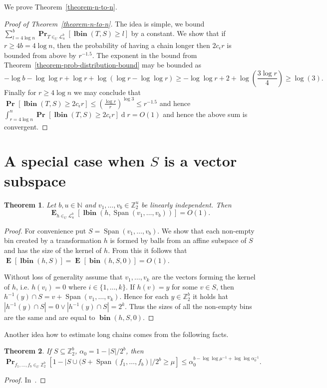 \documentclass{article}
\newcommand{\bin}[3]{\operatorname{\mathbf{bin}}({#1}, {#2}, {#3})}
\newcommand{\lbin}[2]{\operatorname{\mathbf{lbin}}({#1}, {#2})}
\newcommand{\vecspace}[2]{\mathbb{Z}_{#1}^{#2}}
\newcommand{\binvecspace}[1]{\vecspace{2}{#1}}
\newcommand{\linearmaps}[2]{\mathcal{L}_{#1}^{#2}}
\newcommand{\probs}[2]{\operatorname{\mathbf{Pr}}_{{#1}}\left[{#2}\right]}
\newcommand{\prob}[1]{\probs{}{#1}}
\newcommand{\expects}[2]{\operatorname{\mathbf{E}}_{{#1}}\left[{#2}\right]}
\newcommand{\expect}[1]{\expects{}{#1}}
\newtheorem{theorem}{Theorem}
\begin{document}
We prove Theorem~\ref{theorem-n-to-n}.
\begin{proof}[Proof of Theorem~\ref{theorem-n-to-n}]
The idea is simple, we bound $\sum_{l = 4\log n}^{b} \probs{T\in_U\linearmaps{u}{b}}{\lbin{T}{S} \geq l}$ by a constant.
We show that if $r \geq 4b = 4\log n$, then the probability of having a chain longer then $2 c_\epsilon r$ is bounded from above by $r^{-1.5}$.
The exponent in the bound from Theorem~\ref{theorem-prob-distribution-bound} may be bounded as
\[
-\log b - \log \log r + \log r + \log (\log r - \log \log r) \geq -\log \log r + 2 + \log \left(\frac{3\log r}{4}\right) \geq \log(3).
\]
Finally for $r \geq 4\log n$ we may conclude that $\prob{\lbin{T}{S} \geq 2c_\epsilon r} \leq \left(\frac{\log r}{r}\right)^{\log 3} \leq r^{-1.5}$ and hence $\int_{r = 4\log n}^{n} \prob{\lbin{T}{S} \geq 2c_\epsilon r} \operatorname{d}r = O(1)$ and hence the above sum is convergent.
\end{proof}

\section{A special case when $S$ is a vector subspace}

\begin{theorem}
Let $b, u \in \mathbb{N}$ and $v_1, \dots, v_b \in \mathbb{Z}_2^u$ be linearly independent. Then \[ \expects{h \in_U \linearmaps{u}{b}}{\lbin{h}{\operatorname{Span}(v_1, \dots, v_b)}} = O(1) .\]
\end{theorem}
\begin{proof}
For convenience put $S = \operatorname{Span}(v_1, \dots, v_b)$. 
We show that each non-empty bin created by a transformation $h$ is formed by balls from an affine subspace of $S$ and has the size of the kernel of $h$.
From this it follows that $\expect{\lbin{h}{S}} = \expect{\bin{h}{S}{0}} = O(1)$.

Without loss of generality assume that $v_1, \dots, v_k$ are the vectors forming the kernel of $h$, i.e. $h(v_i) = 0$ where $i \in \{1, \dots, k\}$.
If $h(v) = y$ for some $v \in S$, then $h^{-1}(y) \cap S = v + \operatorname{Span}(v_1, \dots, v_k)$.
Hence for each $y \in \mathbb{Z}_2^b$ it holds hat $|h^{-1}(y) \cap S| = 0 \vee |h^{-1}(y) \cap S| = 2^k$.
Thus the sizes of all the non-empty bins are the same and are equal to $\bin{h}{S}{0}$.
\end{proof}

Another idea how to estimate long chains comes from the following facts.
\begin{theorem}
\label{theorem-bound-general}
If $S \subseteq \binvecspace{b}$, $\alpha_0 = 1 - |S|/2^b$, then \[\probs{f_1, \dots, f_b \in_U \binvecspace{b}}{1 - |S \cup (S + \operatorname{Span}(f_1, \dots, f_b)|/2^b \geq \mu} \leq \alpha_0^{b - \log \log \mu^{-1} + \log \log \alpha_0^{-1}}.\]
\end{theorem}
\begin{proof}
In~\cite{alonetal}.
\end{proof}
\end{document}
